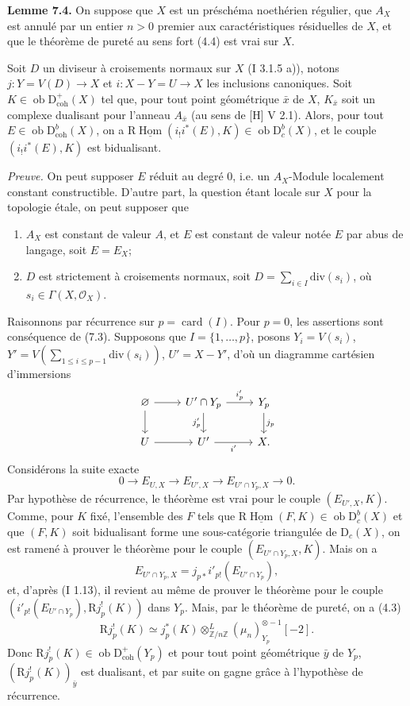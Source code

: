 \documentclass[11pt]{article}
\DeclareMathOperator{\Hom}{Hom}
\newcommand{\R}{\mathrm{R}}
\newcommand{\D}{\mathrm{D}}
\newcommand{\Z}{\mathbb{Z}}
\newcommand{\ob}{\operatorname{ob}}
\providecommand{\Hom}{\operatorname{Hom}}
\providecommand{\ob}{\operatorname{ob}}
\providecommand{\R}{\mathrm R}
\providecommand{\Z}{\mathbb Z}
\providecommand{\Hom}{\operatorname{Hom}}
\begin{document}
\textbf{Lemme 7.4.} On suppose que $X$ est un préschéma noethérien régulier, que $A_X$ est annulé par un entier $n>0$ premier aux caractéristiques résiduelles de $X$, et que le théorème de pureté au sens fort (4.4) est vrai sur $X$.

Soit $D$ un diviseur à croisements normaux sur $X$ (I 3.1.5 a)), notons $j:Y=V(D)\to X$ et $i:X-Y=U\to X$ les inclusions canoniques. Soit $K\in\ob\D^{+}_{\mathrm{coh}}(X)$ tel que, pour tout point géométrique $\bar{x}$ de $X$, $K_{\bar{x}}$ soit un complexe dualisant pour l'anneau $A_{\bar{x}}$ (au sens de [H] V 2.1). Alors, pour tout $E\in\ob\D^{b}_{\mathrm{coh}}(X)$, on a $\R\underline{\Hom}(i_!i^*(E),K)\in\ob\D^{b}_{c}(X)$, et le couple $(i_!i^*(E),K)$ est bidualisant.

\emph{Preuve.} On peut supposer $E$ réduit au degré $0$, i.e. un $A_X$-Module localement constant constructible. D'autre part, la question étant locale sur $X$ pour la topologie étale, on peut supposer que
\begin{enumerate}[label=(\alph*)]
\item $A_X$ est constant de valeur $A$, et $E$ est constant de valeur notée $E$ par abus de langage, soit $E=E_X$;
\item $D$ est strictement à croisements normaux, soit $D=\sum_{i\in I}\mathrm{div}(s_i)$, où $s_i\in\Gamma(X,\mathcal{O}_X)$.
\end{enumerate}
Raisonnons par récurrence sur $p=\operatorname{card}(I)$. Pour $p=0$, les assertions sont conséquence de (7.3). Supposons que $I=\{1,\ldots,p\}$, posons $Y_i=V(s_i)$, $Y'=V(\sum_{1\leq i\leq p-1}\mathrm{div}(s_i))$, $U'=X-Y'$, d'où un diagramme cartésien d'immersions
\[
\begin{tikzcd}
\varnothing \arrow[r] \arrow[d] & U'\cap Y_p \arrow[r,"i'_p"] \arrow[d,"j'_p"'] & Y_p \arrow[d,"j_p"]\\
U \arrow[r] & U' \arrow[r,"i'"'] & X.
\end{tikzcd}
\]
Considérons la suite exacte
\[
        0\longrightarrow E_{U,X}\longrightarrow E_{U',X}\longrightarrow E_{U'\cap Y_p,X}\longrightarrow0.
\]
Par hypothèse de récurrence, le théorème est vrai pour le couple $(E_{U',X},K)$. Comme, pour $K$ fixé, l'ensemble des $F$ tels que $\R\underline{\Hom}(F,K)\in\ob\D_c^b(X)$ et que $(F,K)$ soit bidualisant forme une sous-catégorie triangulée de $\D_c(X)$, on est ramené à prouver le théorème pour le couple $(E_{U'\cap Y_p,X},K)$. Mais on a
\[
        E_{U'\cap Y_p,X}=j_{p*}i'_{p!}(E_{U'\cap Y_p}),
\]
et, d'après (I 1.13), il revient au même de prouver le théorème pour le couple $(i'_{p!}(E_{U'\cap Y_p}),\R j_p^!(K))$ dans $Y_p$. Mais, par le théorème de pureté, on a (4.3)
\[
        \R j_p^!(K)\simeq j_p^*(K)\otimes^L_{\Z/n\Z}(\mu_n)_{Y_p}^{\otimes -1}[-2].
\]
Donc $\R j_p^!(K)\in\ob\D^{+}_{\mathrm{coh}}(Y_p)$ et pour tout point géométrique $\bar{y}$ de $Y_p$, $(\R j_p^!(K))_{\bar{y}}$ est dualisant, et par suite on gagne grâce à l'hypothèse de récurrence.
\end{document}
